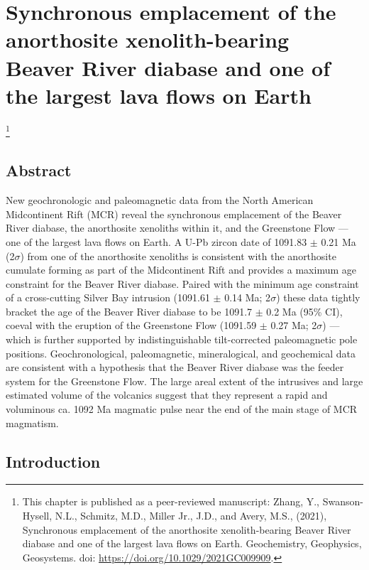 \chapter[Synchronous emplacement of the anorthosite xenolith-bearing Beaver River diabase and one of the largest lava flows on Earth][Beaver Bay Complex]{Synchronous emplacement of the anorthosite xenolith-bearing Beaver River diabase and one of the largest lava flows on Earth}

\let\thefootnote\relax\footnote{This chapter is published as a peer-reviewed manuscript: Zhang, Y., Swanson-Hysell, N.L., Schmitz, M.D., Miller Jr., J.D., and Avery, M.S., (2021), Synchronous emplacement of the anorthosite xenolith-bearing Beaver River diabase and one of the largest lava flows on Earth. Geochemistry, Geophysics, Geosystems. doi: \url{https://doi.org/10.1029/2021GC009909}.}

\section{Abstract}
New geochronologic and paleomagnetic data from the North American Midcontinent Rift (MCR) reveal the synchronous emplacement of the Beaver River diabase, the anorthosite xenoliths within it, and the Greenstone Flow --- one of the largest lava flows on Earth. A U-Pb zircon date of 1091.83 $\pm$ 0.21 Ma (2$\sigma$) from one of the anorthosite xenoliths is consistent with the anorthosite cumulate forming as part of the Midcontinent Rift and provides a maximum age constraint for the Beaver River diabase. Paired with the minimum age constraint of a cross-cutting Silver Bay intrusion (1091.61 $\pm$ 0.14 Ma; 2$\sigma$) these data tightly bracket the age of the Beaver River diabase to be 1091.7 $\pm$ 0.2 Ma (95\% CI), coeval with the eruption of the Greenstone Flow (1091.59 $\pm$ 0.27 Ma; 2$\sigma$) --- which is further supported by indistinguishable tilt-corrected paleomagnetic pole positions. Geochronological, paleomagnetic, mineralogical, and geochemical data are consistent with a hypothesis that the Beaver River diabase was the feeder system for the Greenstone Flow. The large areal extent of the intrusives and large estimated volume of the volcanics suggest that they represent a rapid and voluminous ca. 1092 Ma magmatic pulse near the end of the main stage of MCR magmatism.

\section{Introduction}

